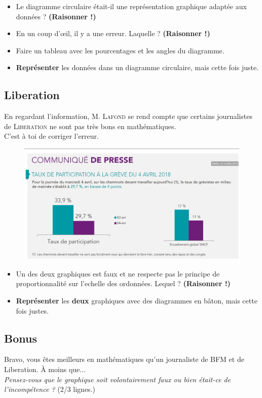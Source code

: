 \documentclass[12pt]{article}
\begin{document}
\begin{itemize}
	\item[1.] Le diagramme circulaire était-il une représentation graphique adaptée aux données ? \textbf{(Raisonner !)}
	\item[2.] En un coup d'œil, il y a une erreur. Laquelle ? \textbf{(Raisonner !)}
	\item[3.] Faire un tableau avec les pourcentages et les angles du diagramme.
	\item[4.] \textbf{Représenter} les données dans un diagramme circulaire, mais cette fois juste.
\end{itemize}	

\subsection*{Liberation}

\begin{multicols}{2}

En regardant l'information, \textsc{M. Lafond} se rend compte que certains journalistes de \textsc{Liberation} ne sont pas très bons en mathématiques.\\
C'est à toi de corriger l'erreur. 

\begin{figure}[H]
	\centering
	\includegraphics[width=\linewidth]{3x1-statistiques/sources/liberation.jpg}
\end{figure}

\end{multicols}

\begin{itemize}
	\item[1.] Un des deux graphiques est faux et ne respecte pas le principe de proportionnalité sur l'echelle des ordonnées. Lequel ? \textbf{(Raisonner !)}
	\item[2.] \textbf{Représenter} les \textbf{deux} graphiques avec des diagrammes en bâton, mais cette fois justes.
\end{itemize}	

\subsection*{Bonus}

Bravo, vous êtes meilleurs en mathématiques qu'un journaliste de BFM et de Liberation. À moins que... \\
\textit{Pensez-vous que le graphique soit volontairement faux ou bien était-ce de l'incompétence ?} (2/3 lignes.)
\end{document}
